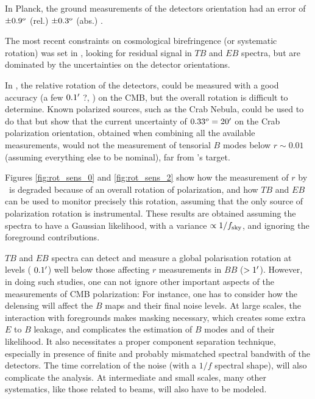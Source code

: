 \documentclass[PICOReport.tex]{subfiles}
\begin{document}
In Planck, the ground measurements of the detectors orientation had an error of $\pm 0.9^o$ (rel.) $\pm 0.3^o$ (abs.) \citep{Rosset+2010}.

The most recent constraints on cosmological birefringence (or systematic rotation) was set in \citet{Planck2016_XLIX}, looking for residual signal in $TB$ and $EB$ spectra, but are dominated by the uncertainties on the detector orientations.

In \pico, the relative rotation of the detectors, could be measured with a good accuracy (a few $0.1'$ ?, ) on the CMB, but the overall rotation is difficult to determine.
Known polarized sources, such as the Crab Nebula, could be used to do that but \citet{Aumont+2018} show that the current uncertainty of $0.33^o = 20'$ on the Crab polarization orientation, obtained when combining all the available measurements, 
would not the measurement of tensorial $B$ modes below $r \sim 0.01$ (assuming everything else to be nominal), far from \pico's target.

Figures \ref{fig:rot_sens_0} and \ref{fig:rot_sens_2} show how the measurement of $r$ by \pico\ is degraded because of an overall rotation of polarization, and how $TB$ and $EB$ can be used to monitor precisely this rotation, assuming that the only source of polarization rotation is instrumental.
These results are obtained assuming the spectra to have a Gaussian likelihood, with a variance $\propto 1/f_{\rm sky}$, and ignoring the foreground contributions.



$TB$ and $EB$ spectra can detect and measure a global polarisation rotation at levels ($~0.1 '$) well below those affecting $r$ measurements in $BB$ ($> 1 '$).
However, in doing such studies, one can not ignore other important aspects of the measurements of CMB polarization:
For instance, one has to consider how the delensing will affect the $B$ maps and their final noise levels.
At large scales, the interaction with foregrounds makes masking necessary, which creates some extra $E$ to $B$ leakage, and complicates the estimation of $B$ modes and of their likelihood. It also necessitates a proper component separation technique, especially in presence of finite and probably mismatched spectral bandwith of the detectors.
The time correlation of the noise (with a $1/f$ spectral shape), will also complicate the analysis.
At intermediate and small scales, many other systematics, like those related to beams, will also have to be modeled.
\end{document}
